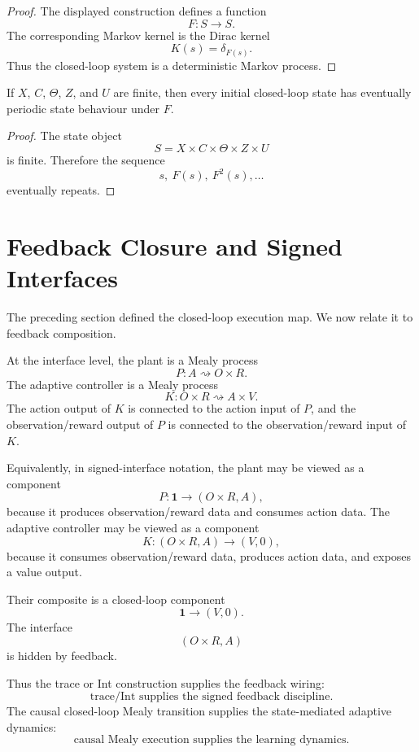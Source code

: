 \begin{proof}
The displayed construction defines a function
\[
F:S\longrightarrow S.
\]
The corresponding Markov kernel is the Dirac kernel
\[
K(s)=\delta_{F(s)}.
\]
Thus the closed-loop system is a deterministic Markov process.
\end{proof}

\begin{corollary}
\label{cor:eventually-periodic-cybernetic}
If \(X\), \(C\), \(\Theta\), \(Z\), and \(U\) are finite, then every initial closed-loop state has
eventually periodic state behaviour under \(F\).
\end{corollary}

\begin{proof}
The state object
\[
S=X\times C\times\Theta\times Z\times U
\]
is finite.  Therefore the sequence
\[
s,\ F(s),\ F^2(s),\ldots
\]
eventually repeats.
\end{proof}

\section{Feedback Closure and Signed Interfaces}
\label{sec:feedback-signed-interfaces-cybernetics}

The preceding section defined the closed-loop execution map.  We now relate it to feedback
composition.

At the interface level, the plant is a Mealy process
\[
P:A\rightsquigarrow O\times R.
\]
The adaptive controller is a Mealy process
\[
K:O\times R\rightsquigarrow A\times V.
\]
The action output of \(K\) is connected to the action input of \(P\), and the observation/reward
output of \(P\) is connected to the observation/reward input of \(K\).

Equivalently, in signed-interface notation, the plant may be viewed as a component
\[
P:\mathbf 1\longrightarrow (O\times R,A),
\]
because it produces observation/reward data and consumes action data.  The adaptive controller may
be viewed as a component
\[
K:(O\times R,A)\longrightarrow (V,0),
\]
because it consumes observation/reward data, produces action data, and exposes a value output.

Their composite is a closed-loop component
\[
\mathbf 1\longrightarrow (V,0).
\]
The interface
\[
(O\times R,A)
\]
is hidden by feedback.

Thus the trace or Int construction supplies the feedback wiring:
\[
\boxed{
\text{trace/Int supplies the signed feedback discipline}.
}
\]
The causal closed-loop Mealy transition supplies the state-mediated adaptive dynamics:
\[
\boxed{
\text{causal Mealy execution supplies the learning dynamics}.
}
\]


